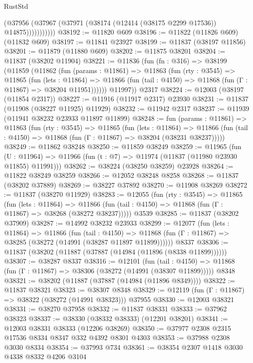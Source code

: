 \begin{lexlean}{RustStd}
\begin{coremodule}
                  (@37956 (@37967 (@37971 (@38174 (@12414 (@38175 @2299 @17536)) @14875)))))))))))
@38192 := @11820 @609
@38196 := @11822 (@11826 @609) (@11832 @609)
@38197 := @11841 @23927
@38199 := @11837 (@38197 @11856)
@38201 := @11879 (@11880 @609)
@38202 := @11875 @38201
@38204 := @11837 (@38202 @11904)
@38221 := @11836
    (fun (fn : @316) =>
    @38199
      (@11859
        (@11862
          (fun (params : @11861) =>
          @11863
            (fun (rty : @3545) =>
            @11865
              (fun (lets : @11864) =>
              @11866 (fun (tail : @4150) => @11868 (fun (Γ : @11867) => @38204 @11951))))))
        @11997))
    @2317
@38224 := @12003 (@38197 (@11854 @2317))
@38227 := @11916 (@11917 @2317) @23930
@38231 := @11837 (@11908 (@38227 @11925) @11929)
@38232 := @11942 @2317
@38237 := @11939 (@11941 @38232 @23933 @11897 @11899)
@38248 := fun (params : @11861) =>
  @11863
    (fun (rty : @3545) =>
    @11865
      (fun (lets : @11864) =>
      @11866 (fun (tail : @4150) => @11868 (fun (Γ : @11867) => @38204 (@38231 @38237)))))
@38249 := @11862 @38248
@38250 := @11859 @38249
@38259 := @11965
    (fun (U : @11964) => @11966 (fun (t : @7) => @11974 (@11837 (@11980 @23930 @11855) @11991)))
@38262 := @38224 (@38250 @38259) @23928
@38264 := @11822 @38249 @38259
@38266 := @12052 @38248 @8258
@38268 := @11837 (@38202 @37889)
@38269 := @38227 @37892
@38270 := @11908 @38269
@38272 := @11837 (@38270 @11929)
@38283 := @12055
    (fun (rty : @3545) =>
    @11865
      (fun (lets : @11864) =>
      @11866 (fun (tail : @4150) => @11868 (fun (Γ : @11867) => @38268 (@38272 @38237)))))
    @3539
@38285 := @11837 (@38202 @37909)
@38287 := @14992 @38232 @23933
@38299 := @12077
    (fun (lets : @11864) =>
    @11866
      (fun (tail : @4150) =>
      @11868 (fun (Γ : @11867) => @38285 (@38272 (@14991 (@38287 @11897 @11899))))))
    @8337
@38306 := @11837 (@38202 (@11887 (@37887 (@14984 (@11896 (@8338 @11899))))))
@38307 := @38287 @8337
@38316 := @12101
    (fun (tail : @4150) => @11868 (fun (Γ : @11867) => @38306 (@38272 (@14991 (@38307 @11899)))))
    @8348
@38321 := @38202 (@11887 (@37887 (@14984 (@11896 @8349))))
@38322 := @11837 @38321
@38323 := @38307 @8348
@38329 := @12119 (fun (Γ : @11867) => @38322 (@38272 (@14991 @38323))) @37955
@38330 := @12003 @38321
@38331 := @38270 @37958
@38332 := @11837 @38331
@38333 := @37962 @38323
@38337 := @38330 (@38332 @38333) (@12201 @38201)
@38341 := @12003 @38331 @38333 (@12206 @38269)
@38350 := @37977 @2308 @2315 @17536 @8334 @8347 @332 @4392 @8301 @4303
@38353 := @37988 @2308 @3030 @8334
@38354 := @37993 @734
@38361 := @38354 @2307 @1418 @3030 @4338 @8332 @4206 @3104

\end{coremodule}
\end{lexlean}

